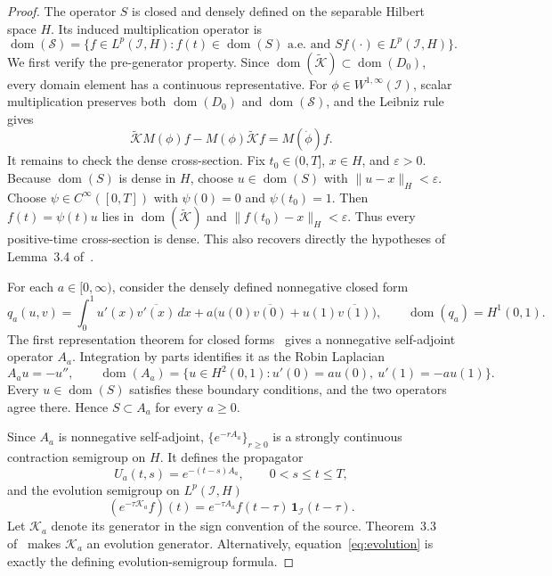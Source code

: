 \documentclass[11pt]{article}
\newcommand{\dom}{\operatorname{dom}}
\newcommand{\Ktilde}{\widetilde{\mathcal K}}
\newcommand{\I}{\mathcal I}
\begin{document}
\begin{proof}
The operator $S$ is closed and densely defined on the separable Hilbert space
$H$.  Its induced multiplication operator is
\[
 \dom(\mathcal S)=
 \{f\in L^p(\I,H): f(t)\in\dom(S)\text{ a.e. and }Sf(\cdot)\in L^p(\I,H)\}.
\]
We first verify the pre-generator property.  Since
$\dom(\Ktilde)\subset\dom(D_0)$, every domain element has a continuous
representative.  For $\phi\in W^{1,\infty}(\I)$, scalar multiplication
preserves both $\dom(D_0)$ and $\dom(\mathcal S)$, and the Leibniz rule gives
\[
 \Ktilde M(\phi)f-M(\phi)\Ktilde f=M(\dot\phi)f.
\]
It remains to check the dense cross-section.  Fix $t_0\in(0,T]$, $x\in H$,
and $\varepsilon>0$.  Because $\dom(S)$ is dense in $H$, choose
$u\in\dom(S)$ with $\|u-x\|_H<\varepsilon$.  Choose
$\psi\in C^\infty([0,T])$ with $\psi(0)=0$ and $\psi(t_0)=1$.  Then
$f(t)=\psi(t)u$ lies in $\dom(\Ktilde)$ and
$\|f(t_0)-x\|_H<\varepsilon$.  Thus every positive-time cross-section is
dense.  This also recovers directly the hypotheses of Lemma~3.4
of~\cite{NSZ}.

For each $a\in[0,\infty)$, consider the densely defined nonnegative closed
form
\begin{equation}\label{eq:form}
 q_a(u,v)=\int_0^1 u'(x)\overline{v'(x)}\,dx
 +a\bigl(u(0)\overline{v(0)}+u(1)\overline{v(1)}\bigr),
 \qquad \dom(q_a)=H^1(0,1).
\end{equation}
The first representation theorem for closed forms~\cite[Chapter~VI]{Kato}
gives a nonnegative self-adjoint operator $A_a$.  Integration by parts
identifies it as the Robin Laplacian
\begin{equation}\label{eq:robin}
 A_a u=-u'',\qquad
 \dom(A_a)=\{u\in H^2(0,1):u'(0)=a u(0),\ u'(1)=-a u(1)\}.
\end{equation}
Every $u\in\dom(S)$ satisfies these boundary conditions, and the two
operators agree there.  Hence $S\subset A_a$ for every $a\geq0$.

Since $A_a$ is nonnegative self-adjoint, $\{e^{-rA_a}\}_{r\geq0}$ is a
strongly continuous contraction semigroup on $H$.  It defines the propagator
\[
 U_a(t,s)=e^{-(t-s)A_a},\qquad 0<s\leq t\leq T,
\]
and the evolution semigroup on $L^p(\I,H)$
\begin{equation}\label{eq:evolution}
 (e^{-\tau\mathcal K_a}f)(t)
 =e^{-\tau A_a}f(t-\tau)\,\mathbf 1_{\I}(t-\tau).
\end{equation}
Let $\mathcal K_a$ denote its generator in the sign convention of the
source.  Theorem~3.3 of~\cite{NSZ} makes $\mathcal K_a$ an evolution
generator.  Alternatively, equation~\eqref{eq:evolution} is exactly the
defining evolution-semigroup formula.


\end{proof}
\end{document}
